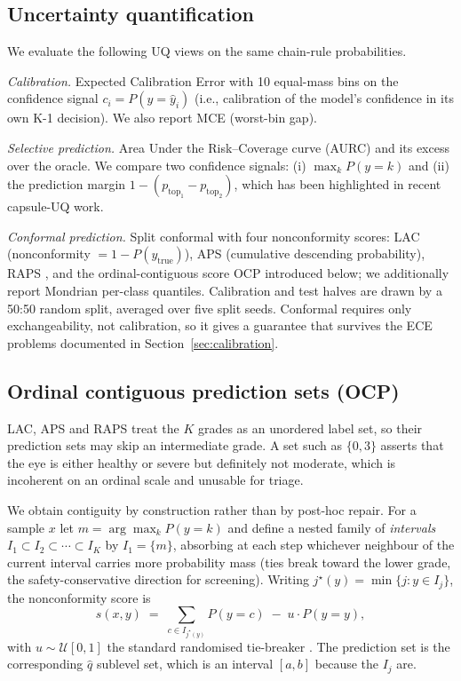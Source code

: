 \documentclass[journal]{IEEEtran}
\begin{document}
\subsection{Uncertainty quantification}
\label{sec:uq-method}
We evaluate the following UQ views on the same chain-rule probabilities.

\emph{Calibration.} Expected Calibration Error with 10 equal-mass bins on the confidence signal $c_i = P(y = \hat{y}_i)$ (i.e., calibration of the model's confidence in its own K-1 decision). We also report MCE (worst-bin gap).

\emph{Selective prediction.} Area Under the Risk--Coverage curve (AURC) and its excess over the oracle. We compare two confidence signals: (i) $\max_k P(y{=}k)$ and (ii) the prediction margin $1 - (p_{\text{top}_1} - p_{\text{top}_2})$, which has been highlighted in recent capsule-UQ work.

\emph{Conformal prediction.} Split conformal with four nonconformity scores: LAC \cite{ref:sadinle} (nonconformity $= 1 - P(y_{\text{true}})$), APS \cite{ref:romano} (cumulative descending probability), RAPS \cite{ref:raps}, and the ordinal-contiguous score OCP introduced below; we additionally report Mondrian \cite{ref:mondrian} per-class quantiles. Calibration and test halves are drawn by a 50:50 random split, averaged over five split seeds. Conformal requires only exchangeability, not calibration, so it gives a guarantee that survives the ECE problems documented in Section~\ref{sec:calibration}.

\subsection{Ordinal contiguous prediction sets (OCP)}
\label{sec:ocp}
LAC, APS and RAPS treat the $K$ grades as an unordered label set, so their prediction sets may skip an intermediate grade. A set such as $\{0,3\}$ asserts that the eye is either healthy or severe but definitely not moderate, which is incoherent on an ordinal scale and unusable for triage.

We obtain contiguity by construction rather than by post-hoc repair. For a sample $x$ let $m = \arg\max_k P(y{=}k)$ and define a nested family of \emph{intervals} $I_1 \subset I_2 \subset \cdots \subset I_K$ by $I_1 = \{m\}$, absorbing at each step whichever neighbour of the current interval carries more probability mass (ties break toward the lower grade, the safety-conservative direction for screening). Writing $j^\star(y) = \min\{j : y \in I_j\}$, the nonconformity score is
\begin{equation}
    s(x,y) \;=\; \sum_{c \in I_{j^\star(y)}} P(y{=}c) \;-\; u \cdot P(y{=}y),
    \label{eq:ocp}
\end{equation}
with $u \sim \mathcal{U}[0,1]$ the standard randomised tie-breaker \cite{ref:romano}. The prediction set is the corresponding $\hat{q}$ sublevel set, which is an interval $[a,b]$ because the $I_j$ are.
\end{document}
